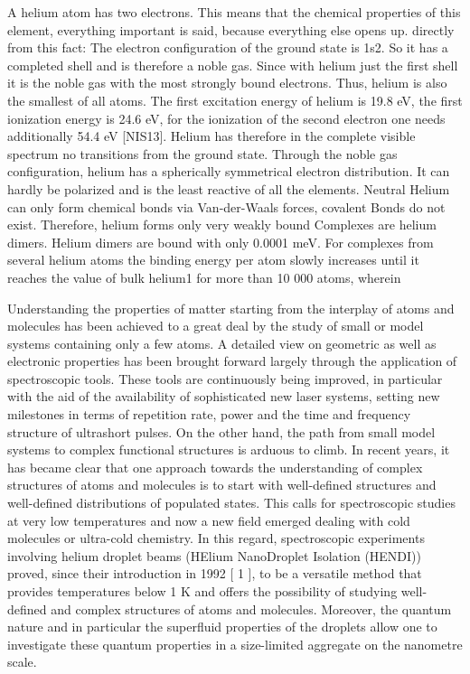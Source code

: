 A helium atom has two electrons. This means that the chemical properties
of this element, everything important is said, because everything else opens up.
directly from this fact:
The electron configuration of the ground state is 1s2. So it has a completed
shell and is therefore a noble gas. Since with helium just the first shell
it is the noble gas with the most strongly bound electrons.
Thus, helium is also the smallest of all atoms. The first excitation energy of helium
is 19.8 eV, the first ionization energy is 24.6 eV, for the ionization of the
second electron one needs additionally 54.4 eV [NIS13]. Helium has therefore in the
complete visible spectrum no transitions from the ground state. Through
the noble gas configuration, helium has a spherically symmetrical electron distribution.
It can hardly be polarized and is the least reactive of all the elements. Neutral
Helium can only form chemical bonds via Van-der-Waals forces, covalent
Bonds do not exist. Therefore, helium forms only very weakly bound
Complexes are helium dimers. Helium dimers are bound with only 0.0001 meV. For complexes
from several helium atoms the binding energy per atom slowly increases
until it reaches the value of bulk helium1 for more than 10 000 atoms, wherein



Understanding the properties of matter starting from the interplay of atoms and molecules
has been achieved to a great deal by the study of small or model systems containing only a
few atoms.  A detailed view on geometric as well as electronic properties has been brought
forward largely through the application of spectroscopic tools.  These tools are continuously
being improved, in particular with the aid of the availability of sophisticated new laser systems,
setting new milestones in terms of repetition rate, power and the time and frequency structure of
ultrashort pulses. On the other hand, the path from small model systems to complex functional
structures is arduous to climb.  In recent years, it has became clear that one approach towards
the understanding of complex structures of atoms and molecules is to start with well-defined
structures  and  well-defined  distributions  of  populated  states.   This  calls  for  spectroscopic
studies at very low temperatures and now a new field emerged dealing with cold molecules or
ultra-cold chemistry. In this regard, spectroscopic experiments involving helium droplet beams
(HElium NanoDroplet Isolation (HENDI)) proved, since their introduction in 1992 [
1
], to be
a versatile method that provides temperatures below 1 K and offers the possibility of studying
well-defined and complex structures of atoms and molecules.  Moreover, the quantum nature
and in particular the superfluid properties of the droplets allow one to investigate these quantum
properties  in  a  size-limited  aggregate  on  the  nanometre  scale.